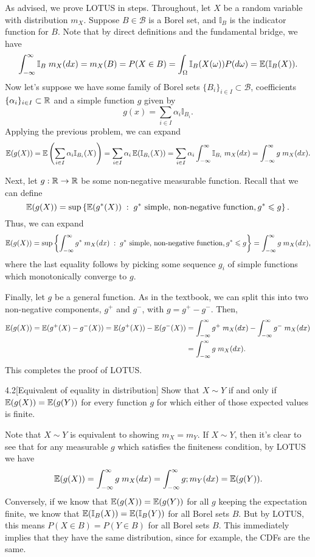\documentclass{pset}
\begin{document}
\begin{solution}
  As advised, we prove LOTUS in steps. Throughout, let $X$ be a random variable with distribution $m_X$. Suppose $B\in \mathcal{B}$ is a Borel set, and $\mathbb{I}_B$ is the indicator function for $B$. 
  Note that by direct definitions and the fundamental bridge, we have
  \[\int^\infty_{-\infty} \mathbb{I}_B\; m_X(dx) = m_X(B) = P(X\in B) = \int_\Omega \mathbb{I}_B(X(\omega)) P(d\omega) = \mathbb{E}(\mathbb{I}_B(X)).\]
  Now let's suppose we have some family of Borel sets $\{B_i\}_{i\in I}\subset \mathcal{B}$, coefficients $\{\alpha_i\}_{i\in I}\subset \mathbb{R}$ and a simple function $g$ given by 
  \[
    g(x) = \sum_{i\in I} \alpha_i \mathbb{I}_{B_i}.
  \]
  Applying the previous problem, we can expand
  \[
    \mathbb{E}(g(X)) = \mathbb{E}\left(\sum_{i\in I}\alpha_i \mathbb{I}_{B_i}(X)\right) = \sum_{i\in I}\alpha_i\, \mathbb{E}(\mathbb{I}_{B_i}(X)) = \sum_{i\in I}\alpha_i \int^\infty_{-\infty}\mathbb{I}_{B_i} \;m_X(dx) = \int_{-\infty}^\infty g\;m_X(dx).
  \]

  Next, let $g : \mathbb{R} \to \mathbb{R}$ be some non-negative measurable function. Recall that we can define
  \[
    \mathbb{E}(g(X)) = \sup\left\{ \mathbb{E}(g^*(X))\;:\; g^*\textrm{ simple, non-negative function}, g^* \leqslant g\right\}.
  \]
  Thus, we can expand
  \[
    \mathbb{E}(g(X)) = \sup\left\{\int_{-\infty}^\infty g^*\; m_X(dx)\;:\; g^*\textrm{ simple, non-negative function}, g^* \leqslant g\right\} = \int_{-\infty}^\infty g\;m_X(dx),
  \]
  where the last equality follows by picking some sequence $g_i$ of simple functions which monotonically converge to $g$.

  Finally, let $g$ be a general function. As in the textbook, we can split this into two non-negative components, $g^+$ and $g^-$, with $g = g^+ - g^-$. Then,
  \[
    \begin{aligned}
      \mathbb{E}(g(X)) = \mathbb{E}(g^+(X) - g^-(X)) = \mathbb{E}(g^+(X)) - \mathbb{E}(g^-(X)) &= \int^\infty_{-\infty} g^+\; m_X(dx) - \int^\infty_{-\infty} g^-\;m_X(dx) \\&= \int^\infty_{-\infty} g\;m_X(dx).
    \end{aligned}
  \]
  This completes the proof of LOTUS.
\end{solution}

\begin{problem}{4.2}[Equivalent of equality in distribution]
  Show that $X\sim Y$ if and only if $\mathbb{E}(g(X)) = \mathbb{E}(g(Y))$ for every function $g$ for which either of those expected values is finite.
\end{problem}

\begin{solution}
  Note that $X\sim Y$ is equivalent to showing $m_X = m_Y$. If $X\sim Y$, then it's clear to see that for any measurable $g$ which satisfies the finiteness condition, by LOTUS we have
  \[\mathbb{E}(g(X)) = \int^\infty_{-\infty} g\; m_X(dx) = \int^\infty_{-\infty} g; m_Y(dx) = \mathbb{E}(g(Y)).\]
  Conversely, if we know that $\mathbb{E}(g(X)) = \mathbb{E}(g(Y))$ for all $g$ keeping the expectation finite, we know that $\mathbb{E}(\mathbb{I}_B(X)) = \mathbb{E}(\mathbb{I}_B(Y))$ for all Borel sets $B$. But by LOTUS, this means $P(X\in B)=P(Y\in B)$ for all Borel sets $B$. This immediately implies that they have the same distribution, since for example, the CDFs are the same.
\end{solution}
\end{document}
